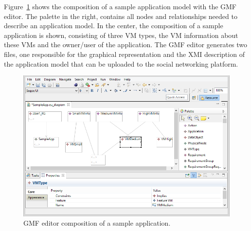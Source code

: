 Figure~\ref{fig:sensapp_as_gmf} shows the composition of a sample application model with the GMF editor. The palette in the right, contains all nodes and relationships needed to describe an application model. In the center, the composition of a sample application is shown, consisting of three VM types, the VM information about these VMs and the owner/user of the application. The GMF editor generates two files, one responsible for the graphical representation and the XMI description of the application model that can be uploaded to the social networking platform.

\begin{figure}
  \centering
  \includegraphics[scale=0.4]{./fig/gmf_editor.png}
  \caption{GMF editor composition of a sample application.}
  \label{fig:sensapp_as_gmf}
\end{figure}

